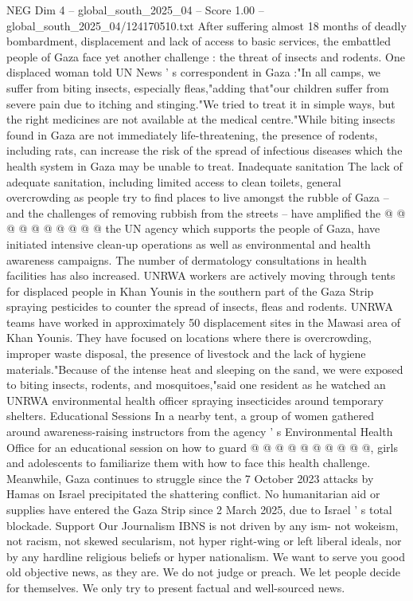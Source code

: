 \begin{textsample}{NEG Dim 4 – global\_south\_2025\_04 – Score 1.00 – global\_south\_2025\_04/124170510.txt}  \label{ex:f4_neg_231}
After suffering almost 18 months of deadly bombardment, displacement and lack of access to basic services, the embattled people of Gaza face yet another challenge : the threat of insects and rodents.
One displaced woman told UN News ' s correspondent in Gaza :"In all camps, we suffer from biting insects, especially fleas,"adding that"our children suffer from severe pain due to itching and stinging."We tried to treat it in simple ways, but the right medicines are not available at the medical centre."While biting insects found in Gaza are not immediately life-threatening, the presence of rodents, including rats, can increase the risk of the spread of infectious diseases which the health system in Gaza may be unable to treat.
Inadequate sanitation The lack of adequate sanitation, including limited access to clean toilets, general overcrowding as people try to find places to live amongst the rubble of Gaza -- and the challenges of removing rubbish from the streets -- have amplified the @ @ @ @ @ @ @ @ @ @ the UN agency which supports the people of Gaza, have initiated intensive clean-up operations as well as environmental and health awareness campaigns.
The number of dermatology consultations in health facilities has also increased.
UNRWA workers are actively moving through tents for displaced people in Khan Younis in the southern part of the Gaza Strip spraying pesticides to counter the spread of insects, fleas and rodents.
UNRWA teams have worked in approximately 50 displacement sites in the Mawasi area of Khan Younis.
They have focused on locations where there is overcrowding, improper waste disposal, the presence of livestock and the lack of hygiene materials."Because of the intense heat and sleeping on the sand, we were exposed to biting insects, rodents, and mosquitoes,"said one resident as he watched an UNRWA environmental health officer spraying insecticides around temporary shelters.
Educational Sessions In a nearby tent, a group of women gathered around awareness-raising instructors from the agency ' s Environmental Health Office for an educational session on how to guard @ @ @ @ @ @ @ @ @ @, girls and adolescents to familiarize them with how to face this health challenge.
Meanwhile, Gaza continues to struggle since the 7 October 2023 attacks by Hamas on Israel precipitated the shattering conflict.
No humanitarian aid or supplies have entered the Gaza Strip since 2 March 2025, due to Israel ' s total blockade.
Support Our Journalism IBNS is not driven by any ism- not wokeism, not racism, not skewed secularism, not hyper right-wing or left liberal ideals, nor by any hardline religious beliefs or hyper nationalism.
We want to serve you good old objective news, as they are.
We do not judge or preach.
We let people decide for themselves.
We only try to present factual and well-sourced news.

\end{textsample}
